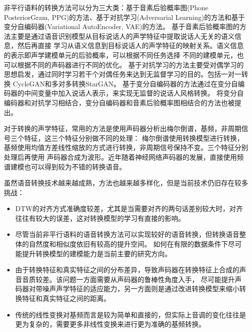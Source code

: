 非平行语料的转换方法可以分为三大类：基于音素后验概率图(Phone PosteriorGram, PPG)的方法、基于对抗学习(Adversarial Learning)的方法和基于变分自编码器(Variational AutoEncoder, VAE)的方法。
基于音素后验概率图的方法主要是通过语音识别模型从目标说话人的声学特征中提取说话人无关的语义信息，然后再直接
学习从语义信息到目标说话人的声学特征的映射关系\cite{sun2016phonetic}。语义信息的表示即声学建模单元的后验概率，可以根据不同任务选择
不同的建模单元，也可以根据不同的声码器进行不同的优化\cite{liu2018hccl,lu2019compact,liu2019jointly,zhou2019cross}。
基于对抗学习的方法主要受对偶学习的思想启发，通过同时学习若干个对偶任务来达到无监督学习的目的。包括一对一转换
CycleGAN\cite{kaneko2017parallel,kaneko2019cyclegan}和多对多转换StarGAN\cite{kameoka2018stargan,kaneko2019stargan}。
基于变分自编码器的方法通过在变分自编码器的中间变量中加入说话人表示，来实现无监督的说话人风格转换\cite{hsu2016voice,kameoka2019acvae}。
将变分自编码器和对抗学习相结合\cite{hsu2017voice}，变分自编码器和音素后验概率图相结合\cite{saito2018non}的方法也被提出。

% 

对于转换的声学特征，常用的方法是使用声码器分析出梅尔倒谱，基频，非周期信号三个特征，这三个特征分别做不同的处理：
梅尔倒谱使用转换模型进行转换，基频使用均值方差线性缩放的方式进行转换，非周期信号保持不变。三个特征分别处理后再使用
声码器合成为波形。近年随着神经网络声码器的发展，直接使用频谱建模也可以得到较为不错的转换语音。



虽然语音转换技术越来越成熟，方法也越来越多样化，但是当前技术仍旧存在较多挑战：
\begin{itemize}
    \item DTW的对齐方式准确度较差，尤其是当需要对齐的两句话差别较大时，对齐往往有较大的误差，这对转换模型的学习有直接的影响。
    \item 尽管当前非平行语料的语音转换方法可以实现较好的语音转换，但转换语音整体的自然度和相似度依旧有较高的提升空间。
    如何在有限的数据条件下尽可能提升转换模型的建模能力是当前主要的研究方向。
    \item 由于转换特征和真实特征之间的分布差异，导致声码器在转换特征上合成的声音音质较差。该问题一方面需要从声码器的鲁棒性角度入手，
    尽可能提升声码器对带噪声声学特征的适应能力，另一方面则是通过改进转换模型来缩小转换特征和真实特征之间的距离。
    \item 传统的线性变换对基频而言是较为简单和直接的，但实际上音调的变化往往是更为复杂的，需要更多非线性变换来进行更为准确的基频转换。
\end{itemize}

